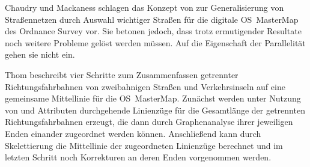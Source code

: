 \documentclass[../main/thesis.tex]{subfiles}
\begin{document}

Chaudry und Mackaness schlagen das Konzept von  zur Generalisierung von Straßennetzen durch Auswahl wichtiger Straßen für die digitale OS~MasterMap des Ordnance Survey vor. Sie betonen jedoch, dass trotz ermutigender Resultate noch weitere Probleme gelöst werden müssen. Auf die Eigenschaft der Parallelität gehen sie nicht ein. 


Thom beschreibt vier Schritte zum Zusammenfassen getrennter Richtungsfahrbahnen von zweibahnigen Straßen und Verkehrsinseln auf eine gemeinsame Mittellinie für die OS~MasterMap. Zunächst werden unter Nutzung von  und Attributen durchgehende Linienzüge für die Gesamtlänge der getrennten Richtungsfahrbahnen erzeugt, die dann durch Graphenanalyse ihrer jeweiligen Enden einander zugeordnet werden können. Anschließend kann durch Skelettierung die Mittellinie der zugeordneten Linienzüge berechnet und im letzten Schritt noch Korrekturen an deren Enden vorgenommen werden. 
\end{document}
